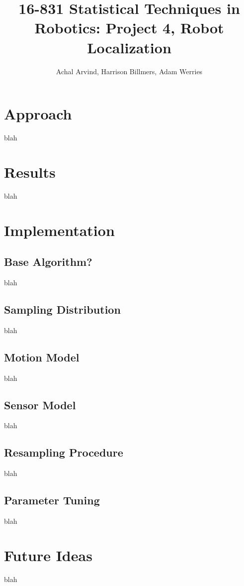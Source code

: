 \documentclass{homework}
\title{16-831 Statistical Techniques in Robotics: Project 4, Robot Localization}
\author{Achal Arvind, Harrison Billmers, Adam Werries}
\begin{document}
\maketitle

\section{Approach}
	blah

\section{Results}
	blah

\section{Implementation}
	\subsection{Base Algorithm?}
		blah
	\subsection{Sampling Distribution}
		blah
	\subsection{Motion Model}
		blah
	\subsection{Sensor Model}
		blah
	\subsection{Resampling Procedure}
		blah
	\subsection{Parameter Tuning}
		blah
\section{Future Ideas}
	blah
\end{document}
